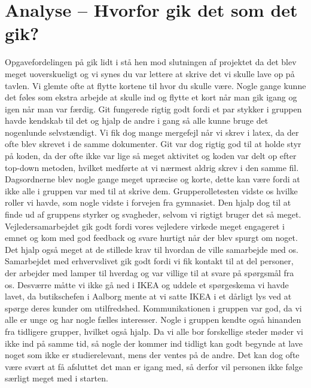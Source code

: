 \documentclass[oneside,a4paper,titlepage]{article}
\begin{document}
\section{Analyse – Hvorfor gik det som det gik?}
Opgavefordelingen på gik lidt i stå hen mod slutningen af projektet da det blev meget uoverskueligt og vi synes du var lettere at skrive det vi skulle lave op på tavlen. Vi glemte ofte at flytte kortene til hvor du skulle være. Nogle gange kunne det føles som ekstra arbejde at skulle ind og flytte et kort når man gik igang og igen når man var færdig. \newline\newline
Git fungerede rigtig godt fordi et par stykker i gruppen havde kendskab til det og hjalp de andre i gang så alle kunne bruge det nogenlunde selvstændigt. Vi fik dog mange mergefejl når vi skrev i latex, da der ofte blev skrevet i de samme dokumenter. Git var dog rigtig god til at holde styr på koden, da der ofte ikke var lige så meget aktivitet og koden var delt op efter top-down metoden, hvilket medførte at vi nærmest aldrig skrev i den samme fil. \newline\newline
Dagsordnerne blev nogle gange meget upræcise og korte, dette kan være fordi at ikke alle i gruppen var med til at skrive dem. 
Grupperolletesten vidste os hvilke roller vi havde, som nogle vidste i forvejen fra gymnasiet. Den hjalp dog til at finde ud af gruppens styrker og svagheder, selvom vi rigtigt bruger det så meget. 
Vejledersamarbejdet gik godt fordi vores vejledere virkede meget engageret i emnet og kom med god feedback og svare hurtigt når der blev spurgt om noget. Det hjalp også meget at de stillede krav til hvordan de ville samarbejde med os. 
Samarbejdet med erhvervslivet gik godt fordi vi fik kontakt til at del personer, der arbejder med lamper til hverdag og var villige til at svare på spørgsmål fra os. Desværre måtte vi ikke gå ned i IKEA og uddele et spørgeskema vi havde lavet, da butikschefen i Aalborg mente at vi satte IKEA i et dårligt lys ved at spørge deres kunder om utilfredshed. \newline\newline
Kommunikationen i gruppen var god, da vi alle er unge og har nogle fælles interesser. Nogle i gruppen kendte også hinanden fra tidligere grupper, hvilket også hjalp.
Da vi alle bor forskellige steder møder vi ikke ind på samme tid, så nogle der kommer ind tidligt kan godt begynde at lave noget som ikke er studierelevant, mens der ventes på de andre. Det kan dog ofte være svært at få afsluttet det man er igang med, så derfor vil personen ikke følge særligt meget med i starten. 
\end{document}
